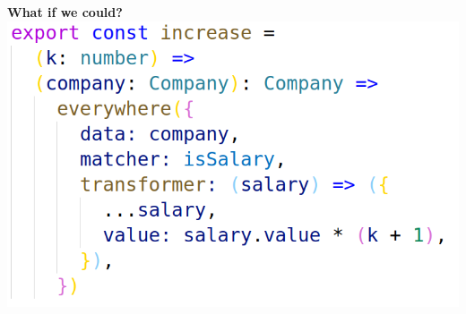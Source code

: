 \documentclass[14pt]{beamer}
\begin{document}
\begin{frame}
  \textbf{What if we could?}
  \vfill
  \includegraphics[height=0.8\textheight,width=\textwidth,keepaspectratio]{graphics/increase-ts.png}
\end{frame}
\end{document}

